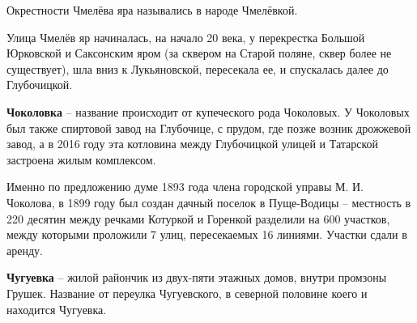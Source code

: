 Окрестности Чмелёва яра назывались в народе Чмелёвкой.

Улица Чмелёв яр начиналась, на начало 20 века, у перекрестка Большой Юрковской и Саксонским яром (за сквером на Старой поляне, сквер более не существует), шла вниз к Лукьяновской, пересекала ее, и спускалась далее до Глубочицкой.\\


\medskip

\textbf{Чоколовка} – название происходит от купеческого рода Чоколовых. У Чоколовых был также спиртовой завод на Глубочице, с прудом, где позже возник дрожжевой завод, а в 2016 году эта котловина между Глубочицкой улицей и Татарской застроена жилым комплексом.

Именно по предложению думе 1893 года члена городской управы М. И. Чоколова, в 1899 году был создан дачный поселок в Пуще-Водицы – местность в 220 десятин между речками Котуркой и Горенкой разделили на 600 участков, между которыми проложили 7 улиц, пересекаемых 16 линиями. Участки сдали в аренду.\\

\medskip


\textbf{Чугуевка} – жилой райончик из двух-пяти этажных домов, внутри промзоны Грушек. Название от переулка Чугуевского, в северной половине коего и находится Чугуевка.